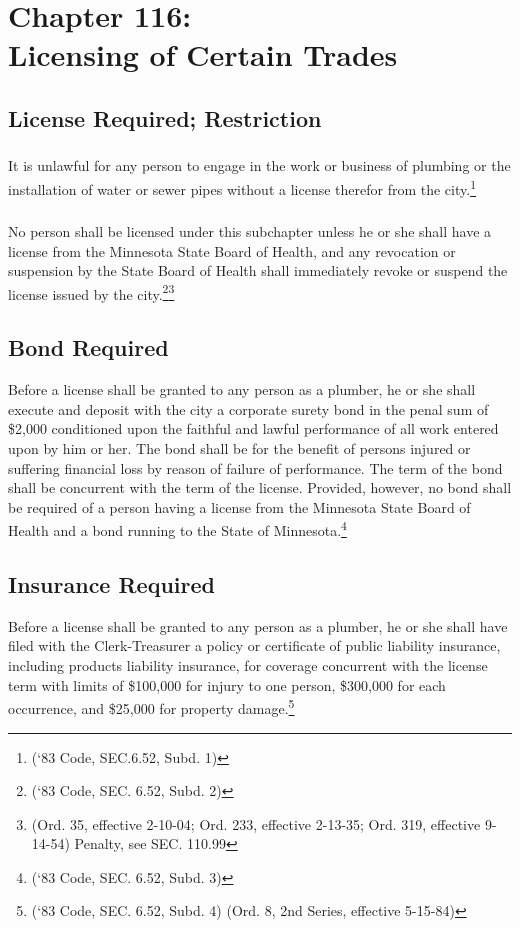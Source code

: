 \chapter*{Chapter 116: \\
	Licensing of Certain Trades}
    \minitoc
    \pagebreak


\section{License Required; Restriction}
\subsection{}
It is unlawful for any person to engage in the work or business of plumbing or the installation of water or sewer pipes without a license therefor from the city.\footnote{(‘83 Code, SEC.6.52, Subd. 1)}
\subsection{}
No person shall be licensed under this subchapter unless he or she shall have a license from the Minnesota State Board of Health, and any revocation or suspension by the State Board of Health shall immediately revoke or suspend the license issued by the city.\footnote{(‘83 Code, SEC. 6.52, Subd. 2)}\footnote{(Ord. 35, effective 2-10-04; Ord. 233, effective 2-13-35; Ord. 319, effective 9-14-54)  Penalty, see SEC. 110.99}
\section{Bond Required}
Before a license shall be granted to any person as a plumber, he or she shall execute and deposit with the city a corporate surety bond in the penal sum of \$2,000 conditioned upon the faithful and lawful performance of all work entered upon by him or her. The bond shall be for the benefit of persons injured or suffering financial loss by reason of failure of performance. The term of the bond shall be concurrent with the term of the license. Provided, however, no bond shall be required of a person having a license from the Minnesota State Board of Health and a bond running to the State of Minnesota.\footnote{(‘83 Code, SEC. 6.52, Subd. 3)}
\section{Insurance Required}
Before a license shall be granted to any person as a plumber, he or she shall have filed with the Clerk-Treasurer a policy or certificate of public liability insurance, including products liability insurance, for coverage concurrent with the license term with limits of \$100,000 for injury to one person, \$300,000 for each occurrence, and \$25,000 for property damage.\footnote{(‘83 Code, SEC. 6.52, Subd. 4)  (Ord. 8, 2nd Series, effective 5-15-84)}

